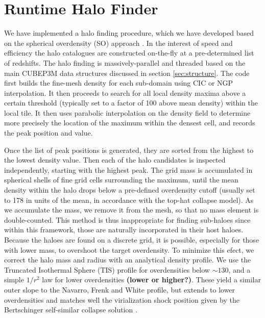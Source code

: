 \documentclass[useAMS,usenatbib]{mn2e}
\begin{document}
\section{Runtime Halo Finder}
\label{sec:halo}


We have implemented a halo finding procedure, which we have developed 
based on the spherical overdensity (SO) approach \citep{1994MNRAS.271..676L}.
In the interest of speed and efficiency the halo catalogues are constructed 
on-the-fly at a pre-determined list of redshifts. The halo finding is 
massively-parallel and threaded based on the main {\small CUBEP3M} data structures 
discussed in section \ref{sec:structure}. The code first builds the 
fine-mesh density for each sub-domain using CIC or NGP interpolation. It then 
proceeds to search for all local density maxima above a certain
threshold (typically set to a factor of 100 above mean density) within the local tile. 
It then uses parabolic interpolation on the density field to determine more precisely
the location of the maximum within the densest cell, and records the peak 
position and value. %

Once the list of peak positions is generated, they are sorted from the highest 
to the lowest density value. Then each of the halo candidates is inspected 
independently, starting with the highest peak. The grid mass is accumulated 
in spherical shells of fine grid cells surrounding the maximum, until the 
mean density within the halo drops below a pre-defined overdensity cutoff 
(usually set to 178 in units of the mean, in accordance with the top-hat 
collapse model). As we accumulate the mass, we remove it from the mesh, so that no 
mass element is double-counted. This method is thus inappropriate for finding 
sub-haloes since within this framework, those are naturally incorporated in their 
host haloes. Because the haloes are found on a discrete grid, it is 
possible, especially for those with lower mass, to overshoot the target overdensity.
To minimize this efect, we correct the halo mass and radius with an analytical density profile. 
We use the Truncated Isothermal Sphere (TIS) 
profile \citep{1999MNRAS.307..203S,2001MNRAS.325..468I} for overdensities below 
$\sim130$, and a simple $1/r^2$ law for lower overdensities {\bf (lower or higher?)}. 
These yield a similar outer slope to the Navarro, Frenk and White 
\citep[NFW][]{1997ApJ...490..493N} profile, but extends to lower overdensities
and matches well the virialization shock position given by the Bertschinger 
self-similar collapse solution \citep{1985ApJS...58...39B}.
\end{document}
